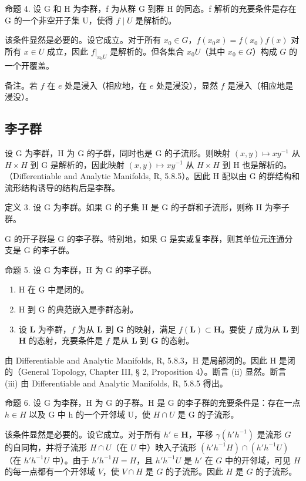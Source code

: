 命题 4. 设 G 和 H 为李群，f 为从群 G 到群 H 的同态。f 解析的充要条件是存在 G 的一个非空开子集 U，使得 \(f \mid U\) 是解析的。

该条件显然是必要的。设它成立。对于所有 \(x_0 \in G\)，\(f(x_0x) = f(x_0)f(x)\) 对所有 \(x \in U\) 成立，因此 \(f|_{x_0U}\) 是解析的。但各集合 \(x_0U\)（其中 \(x_0 \in G\)）构成 \(G\) 的一个开覆盖。

备注。若 \(f\) 在 \(e\) 处是浸入（相应地，在 \(e\) 处是浸没），显然 \(f\) 是浸入（相应地是浸没）。

\subsection{李子群}

设 G 为李群，H 为 G 的子群，同时也是 G 的子流形。则映射 \((x,y)\mapsto xy^{-1}\) 从 \(H\times H\) 到 G 是解析的，因此映射 \((x,y)\mapsto xy^{-1}\) 从 \(H\times H\) 到 H 也是解析的。（Differentiable and Analytic Manifolds, R, 5.8.5）。因此 H 配以由 G 的群结构和流形结构诱导的结构后是李群。

定义 3. 设 G 为李群。如果 G 的子集 H 是 G 的子群和子流形，则称 H 为李子群。

G 的开子群是 G 的李子群。特别地，如果 G 是实或复李群，则其单位元连通分支是 G 的李子群。

命题 5. 设 G 为李群，H 为 G 的李子群。

\begin{enumerate}
\def\labelenumi{(\roman{enumi})}
\item
  H 在 G 中是闭的。
\item
  H 到 G 的典范嵌入是李群态射。
\item
  设 \(\mathbf{L}\) 为李群，\(f\) 为从 \(\mathbf{L}\) 到 \(\mathbf{G}\) 的映射，满足 \(f(\mathbf{L}) \subset \mathbf{H}\)。要使 \(f\) 成为从 \(\mathbf{L}\) 到 \(\mathbf{H}\) 的态射，充要条件是 \(f\) 是从 \(\mathbf{L}\) 到 \(\mathbf{G}\) 的态射。
\end{enumerate}

由 Differentiable and Analytic Manifolds, R, 5.8.3，H 是局部闭的。因此 H 是闭的（General Topology, Chapter III, § 2, Proposition 4）。断言 (ii) 显然。断言 (iii) 由 Differentiable and Analytic Manifolds, R, 5.8.5 得出。

命题 6. 设 G 为李群，H 为 G 的子群。H 是 G 的李子群的充要条件是：存在一点 \(h \in H\) 以及 G 中 h 的一个开邻域 U，使 \(H \cap U\) 是 G 的子流形。

该条件显然是必要的。设它成立。对于所有 \(h' \in \mathbf{H}\)，平移 \(\gamma (h'h^{-1})\) 是流形 \(G\) 的自同构，并将子流形 \(H \cap U\)（在 \(U\) 中）映入子流形 \((h'h^{-1}H) \cap (h'h^{-1}U)\)（在 \(h'h^{-1}U\) 中）。由于 \(h'h^{-1}H = H\)，且 \(h'h^{-1}U\) 是 \(h'\) 在 \(G\) 中的开邻域，可见 \(H\) 的每一点都有一个开邻域 \(V\)，使 \(V \cap H\) 是 \(G\) 的子流形。因此 \(H\) 是 \(G\) 的子流形。

